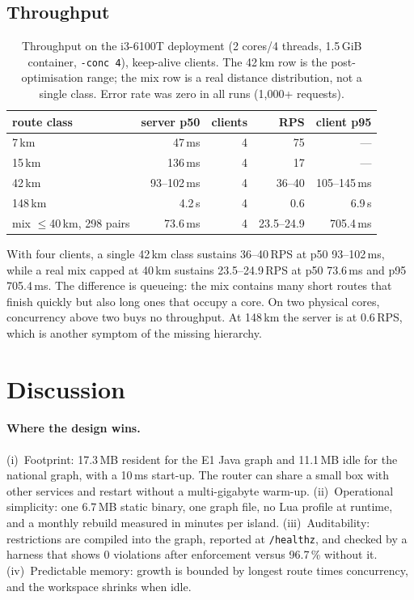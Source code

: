 \documentclass[sigconf,nonacm]{acmart}
\begin{document}
\subsection{Throughput}
\begin{table}[t]
\small
\begin{tabular}{@{}lrrrr@{}}
\toprule
route class & server p50 & clients & RPS & client p95 \\
\midrule
7\,km   &  47\,ms & 4 & 75   & --- \\
15\,km  & 136\,ms & 4 & 17   & --- \\
42\,km  &  93--102\,ms & 4 & 36--40 & 105--145\,ms \\
148\,km & 4.2\,s  & 4 & 0.6  & 6.9\,s \\
mix $\le$40\,km, 298 pairs & 73.6\,ms & 4 & 23.5--24.9 & 705.4\,ms \\
\bottomrule
\end{tabular}
\caption{Throughput on the i3-6100T deployment (2 cores/4 threads, 1.5\,GiB
container, \texttt{-conc 4}), keep-alive clients. The 42\,km row is the
post-optimisation range; the mix row is a real distance distribution, not a
single class. Error rate was zero in all runs (1{,}000+ requests).}
\label{tab:throughput}
\end{table}

With four clients, a single 42\,km class sustains 36--40\,RPS at p50
93--102\,ms, while a real mix capped at 40\,km sustains 23.5--24.9\,RPS at p50
73.6\,ms and p95 705.4\,ms. The difference is queueing: the mix contains many
short routes that finish quickly but also long ones that occupy a core. On two
physical cores, concurrency above two buys no throughput. At 148\,km the server
is at 0.6\,RPS, which is another symptom of the missing hierarchy.

\section{Discussion}
\paragraph{Where the design wins.}
(i)~Footprint: 17.3\,MB resident for the E1 Java graph and 11.1\,MB idle for the
national graph, with a 10\,ms start-up. The router can share a small box with
other services and restart without a multi-gigabyte warm-up. (ii)~Operational
simplicity: one 6.7\,MB static binary, one graph file, no Lua profile at runtime,
and a monthly rebuild measured in minutes per island. (iii)~Auditability:
restrictions are compiled into the graph, reported at \texttt{/healthz}, and
checked by a harness that shows 0 violations after enforcement versus 96.7\,\%
without it. (iv)~Predictable memory: growth is bounded by longest route times
concurrency, and the workspace shrinks when idle.
\end{document}
